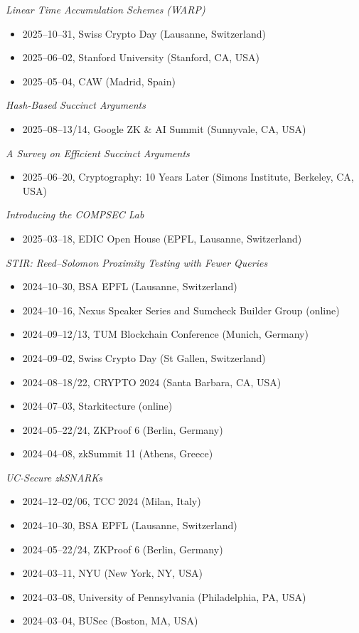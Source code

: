 \documentclass[11pt,a4paper]{article}
\begin{document}
\emph{Linear Time Accumulation Schemes (WARP)}
\begin{itemize}[leftmargin=2em]
  \item 2025--10--31, Swiss Crypto Day (Lausanne, Switzerland)
  \item 2025--06--02, Stanford University (Stanford, CA, USA)
  \item 2025--05--04, CAW (Madrid, Spain)
\end{itemize}

\emph{Hash-Based Succinct Arguments}
\begin{itemize}[leftmargin=2em]
  \item 2025--08--13/14, Google ZK \& AI Summit (Sunnyvale, CA, USA)
\end{itemize}

\emph{A Survey on Efficient Succinct Arguments}
\begin{itemize}[leftmargin=2em]
  \item 2025--06--20, Cryptography: 10 Years Later (Simons Institute, Berkeley, CA, USA)
\end{itemize}

\emph{Introducing the COMPSEC Lab}
\begin{itemize}[leftmargin=2em]
  \item 2025--03--18, EDIC Open House (EPFL, Lausanne, Switzerland)
\end{itemize}

\emph{STIR: Reed--Solomon Proximity Testing with Fewer Queries}
\begin{itemize}[leftmargin=2em]
  \item 2024--10--30, BSA EPFL (Lausanne, Switzerland)
  \item 2024--10--16, Nexus Speaker Series and Sumcheck Builder Group (online)
  \item 2024--09--12/13, TUM Blockchain Conference (Munich, Germany)
  \item 2024--09--02, Swiss Crypto Day (St Gallen, Switzerland)
  \item 2024--08--18/22, CRYPTO 2024 (Santa Barbara, CA, USA)
  \item 2024--07--03, Starkitecture (online)
  \item 2024--05--22/24, ZKProof 6 (Berlin, Germany)
  \item 2024--04--08, zkSummit 11 (Athens, Greece)
\end{itemize}

\emph{UC-Secure zkSNARKs}
\begin{itemize}[leftmargin=2em]
  \item 2024--12--02/06, TCC 2024 (Milan, Italy)
  \item 2024--10--30, BSA EPFL (Lausanne, Switzerland)
  \item 2024--05--22/24, ZKProof 6 (Berlin, Germany)
  \item 2024--03--11, NYU (New York, NY, USA)
  \item 2024--03--08, University of Pennsylvania (Philadelphia, PA, USA)
  \item 2024--03--04, BUSec (Boston, MA, USA)
\end{itemize}
\end{document}
